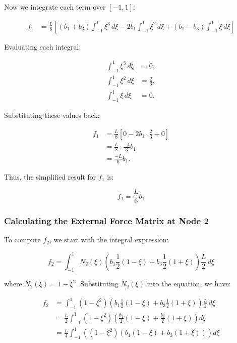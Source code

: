 \documentclass{article}
\begin{document}
Now we integrate each term over \([-1, 1]\):

\begin{align*}
    f_1 &= \frac{L}{8} \left[ (b_1 + b_3) \int_{-1}^{1} \xi^3 \, d\xi - 2b_1 \int_{-1}^{1} \xi^2 \, d\xi + (b_1 - b_3) \int_{-1}^{1} \xi \, d\xi \right]
\end{align*}

Evaluating each integral:

\begin{align*}
    \int_{-1}^{1} \xi^3 \, d\xi &= 0, \\
    \int_{-1}^{1} \xi^2 \, d\xi &= \frac{2}{3}, \\
    \int_{-1}^{1} \xi \, d\xi &= 0.
\end{align*}

Substituting these values back:

\begin{align*}
    f_1 &= \frac{L}{8} \left[ 0 - 2b_1 \cdot \frac{2}{3} + 0 \right] \\
    &= \frac{L}{8} \cdot \frac{-4}{3} b_1 \\
    &= \frac{-L}{6} b_1.
\end{align*}

Thus, the simplified result for \( f_1 \) is:

\begin{equation}
    f_1 = \frac{L}{6} b_1
\end{equation}


\subsubsection*{Calculating the External Force Matrix at Node 2}

To compute \( f_2 \), we start with the integral expression:

\begin{equation}
    f_2 = \int_{-1}^{1} N_2(\xi) \left( b_1 \frac{1}{2}(1 - \xi) + b_3 \frac{1}{2}(1 + \xi) \right) \frac{L}{2} \, d\xi
\end{equation}

where \( N_2(\xi) = 1 - \xi^2 \). Substituting \( N_2(\xi) \) into the equation, we have:

\begin{align*}
    f_2 &= \int_{-1}^{1} \left(1 - \xi^2\right) \left( b_1 \frac{1}{2}(1 - \xi) + b_3 \frac{1}{2}(1 + \xi) \right) \frac{L}{2} \, d\xi \\
    &= \frac{L}{2} \int_{-1}^{1} \left(1 - \xi^2\right) \left( \frac{b_1}{2}(1 - \xi) + \frac{b_3}{2}(1 + \xi) \right) d\xi \\
    &= \frac{L}{4} \int_{-1}^{1} \left( (1 - \xi^2)(b_1(1 - \xi) + b_3(1 + \xi)) \right) d\xi
\end{align*}
\end{document}
